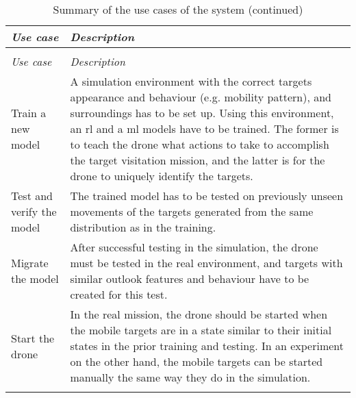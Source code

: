 \documentclass[../main.tex]{subfiles}
\begin{document}
\begin{center}
    \begin{xltabular}{\textwidth}{ p{3.5cm} X }
        \caption{Summary of the use cases of the system.}
        \label{tab:use-case-summaries} \\
        \toprule

        \textit{Use case} & \textit{Description} 
        \\

        \midrule
        \endfirsthead

        \caption[]{Summary of the use cases of the system (continued)} \\
        \toprule

        \textit{Use case} & \textit{Description} 
        \\

        \midrule
        \endhead

        Train a new model
          & A simulation environment with the correct targets
          appearance and behaviour (e.g. mobility pattern), and
          surroundings has to be set up. 
          Using this environment, an \gls{rl} and a \gls{ml} models
          have to be trained. 
          The former is to teach the drone what actions to take to
          accomplish the target visitation mission, and the latter is
          for the drone to uniquely identify the targets. 
        \\ \addlinespace
        Test and verify the model
            & The trained model has to be tested on previously unseen
            movements of the targets generated from the same
            distribution as in the training.
        \\ \addlinespace
        Migrate the model
            & After successful testing in the simulation, the drone
            must be tested in the real environment, and targets with
            similar outlook features and behaviour have to be created
            for this test.
        \\ \addlinespace
        Start the drone
            & In the real mission, the drone should be started when
            the mobile targets are in a state similar to their initial
            states in the prior training and testing.
            In an experiment on the other hand, the mobile targets can
            be started manually the same way they do in the
            simulation.
        \\ \addlinespace

        \bottomrule
    \end{xltabular}
\end{center}
\vspace{-1.5cm}
%
\end{document}
